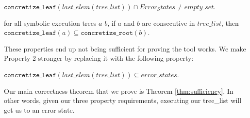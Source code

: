 \begin{property}
  \label{prop:enderror}
$ \mathtt{concretize\_leaf} (last\_elem (tree\_list)) \cap Error_States 
\neq empty\_set $.
\end{property}

\begin{property}
  \label{prop:stitch}
for all symbolic execution trees $a$ $b$, 
if $a$ and $b$ are consecutive in $tree\_list$, then 
$\mathtt{concretize\_leaf} (a) \subseteq
\mathtt{concretize\_root}(b) $.
\end{property}

These properties end up not being sufficient for proving the tool works. 
We make Property 2 stronger by replacing it with the following property:

\setcounter{property}{1}
\renewcommand{\theproperty}{Z.\arabic{property}'}
\begin{property}
  \label{prop:correctedz2}
$\mathtt{concretize\_leaf} (last\_elem (tree\_list))
\subseteq error\_states $.
\end{property}



Our main correctness theorem that we prove is Theorem \ref{thm:sufficiency}. In other words, given our three property requirements, executing our tree\_list will get us to an error state.
